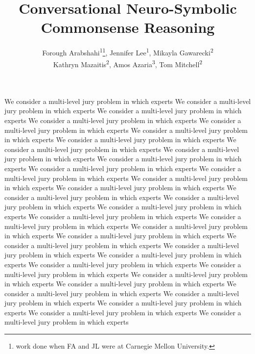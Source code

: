 \documentclass[letterpaper]{article} %
\title{Conversational Neuro-Symbolic Commonsense Reasoning}
\author{Forough Arabshahi\textsuperscript{\rm 1}\footnote{work done when FA and JL were at Carnegie Mellon University.}, Jennifer Lee\textsuperscript{\rm 1}, Mikayla Gawarecki\textsuperscript{\rm 2}\\ Kathryn Mazaitis\textsuperscript{\rm 2}, Amos Azaria\textsuperscript{\rm 3}, Tom Mitchell\textsuperscript{\rm 2}\\ %
}
\begin{document}
\maketitle




% 



% 

% 

% 


% 


% 
We consider a multi-level jury problem in which experts
We consider a multi-level jury problem in which experts
We consider a multi-level jury problem in which experts
We consider a multi-level jury problem in which experts
We consider a multi-level jury problem in which experts
We consider a multi-level jury problem in which experts
We consider a multi-level jury problem in which experts
We consider a multi-level jury problem in which experts
We consider a multi-level jury problem in which experts
We consider a multi-level jury problem in which experts
We consider a multi-level jury problem in which experts
We consider a multi-level jury problem in which experts
We consider a multi-level jury problem in which experts
We consider a multi-level jury problem in which experts
We consider a multi-level jury problem in which experts
We consider a multi-level jury problem in which experts
We consider a multi-level jury problem in which experts
We consider a multi-level jury problem in which experts
We consider a multi-level jury problem in which experts
We consider a multi-level jury problem in which experts
We consider a multi-level jury problem in which experts
We consider a multi-level jury problem in which experts
We consider a multi-level jury problem in which experts
We consider a multi-level jury problem in which experts
We consider a multi-level jury problem in which experts
We consider a multi-level jury problem in which experts
We consider a multi-level jury problem in which experts
We consider a multi-level jury problem in which experts
We consider a multi-level jury problem in which experts
We consider a multi-level jury problem in which experts
We consider a multi-level jury problem in which experts
We consider a multi-level jury problem in which experts
We consider a multi-level jury problem in which experts
\end{document}
